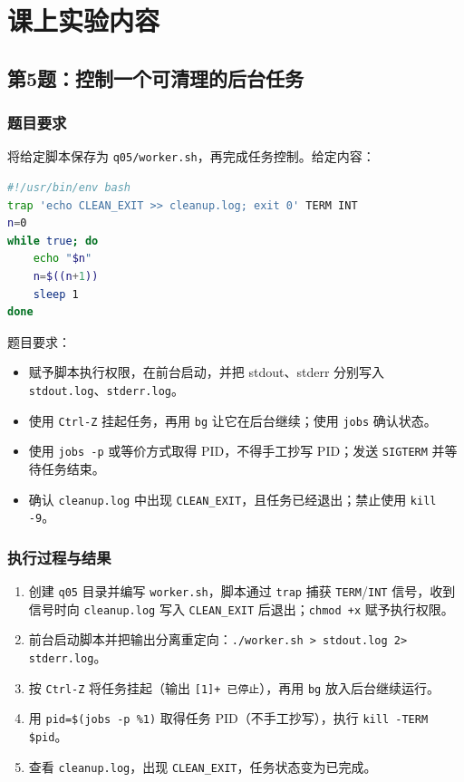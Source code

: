 \documentclass[12pt,a4paper]{article}
\begin{document}
\section{课上实验内容}

\subsection{第5题：控制一个可清理的后台任务}

\subsubsection{题目要求}

将给定脚本保存为 \texttt{q05/worker.sh}，再完成任务控制。给定内容：

\begin{lstlisting}[language=bash]
#!/usr/bin/env bash
trap 'echo CLEAN_EXIT >> cleanup.log; exit 0' TERM INT
n=0
while true; do
    echo "$n"
    n=$((n+1))
    sleep 1
done
\end{lstlisting}

题目要求：

\begin{itemize}
    \item 赋予脚本执行权限，在前台启动，并把 stdout、stderr 分别写入 \texttt{stdout.log}、\texttt{stderr.log}。
    \item 使用 \texttt{Ctrl-Z} 挂起任务，再用 \texttt{bg} 让它在后台继续；使用 \texttt{jobs} 确认状态。
    \item 使用 \texttt{jobs -p} 或等价方式取得 PID，不得手工抄写 PID；发送 \texttt{SIGTERM} 并等待任务结束。
    \item 确认 \texttt{cleanup.log} 中出现 \texttt{CLEAN\_EXIT}，且任务已经退出；禁止使用 \texttt{kill -9}。
\end{itemize}

\subsubsection{执行过程与结果}

\begin{enumerate}
    \item 创建 \texttt{q05} 目录并编写 \texttt{worker.sh}，脚本通过 \texttt{trap} 捕获 \texttt{TERM}/\texttt{INT} 信号，收到信号时向 \texttt{cleanup.log} 写入 \texttt{CLEAN\_EXIT} 后退出；\texttt{chmod +x} 赋予执行权限。
    \item 前台启动脚本并把输出分离重定向：\texttt{./worker.sh > stdout.log 2> stderr.log}。
    \item 按 \texttt{Ctrl-Z} 将任务挂起（输出 \texttt{[1]+ 已停止}），再用 \texttt{bg} 放入后台继续运行。
    \item 用 \texttt{pid=\$(jobs -p \%1)} 取得任务 PID（不手工抄写），执行 \texttt{kill -TERM \$pid}。
    \item 查看 \texttt{cleanup.log}，出现 \texttt{CLEAN\_EXIT}，任务状态变为已完成。
\end{enumerate}
\end{document}
